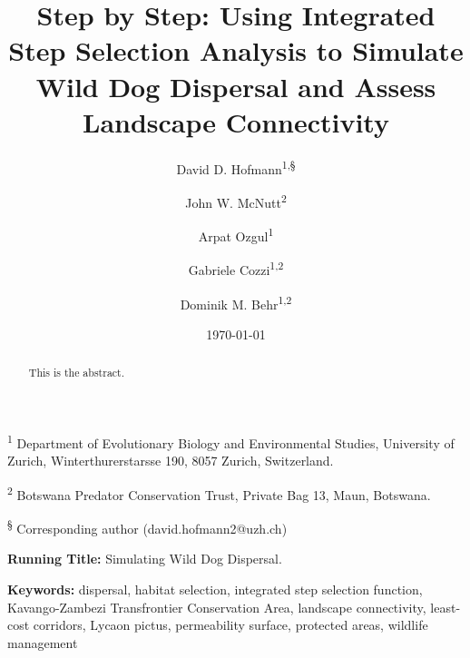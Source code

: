 \documentclass[abstract=on,10pt,a4paper,bibliography=totocnumbered]{article}
\title{Step by Step: Using Integrated Step Selection Analysis to Simulate Wild
Dog Dispersal and Assess Landscape Connectivity}
\author{
  David D. Hofmann\textsuperscript{1,\S} \and
  John W. McNutt\textsuperscript{2} \and
  Arpat Ozgul\textsuperscript{1} \and
  Gabriele Cozzi\textsuperscript{1,2} \and
  Dominik M. Behr\textsuperscript{1,2}
}
\date{\today}
\begin{document}



\maketitle

\begin{flushleft}

\vspace{0.5cm}

\textsuperscript{1} Department of Evolutionary Biology and Environmental
Studies, University of Zurich, Winterthurerstarsse 190, 8057 Zurich,
Switzerland.

\textsuperscript{2} Botswana Predator Conservation Trust, Private Bag 13, Maun,
Botswana.

\textsuperscript{\S} Corresponding author (david.hofmann2@uzh.ch)

\vspace{4cm}

\textbf{Running Title:} Simulating Wild Dog Dispersal.

\vspace{0.5cm}

\textbf{Keywords:} dispersal, habitat selection, integrated step selection
function, Kavango-Zambezi Transfrontier Conservation Area, landscape
connectivity, least-cost corridors, Lycaon pictus, permeability surface,
protected areas, wildlife management

\end{flushleft}

\newpage
\begin{abstract}
This is the abstract.
\end{abstract}

\newpage


\end{document}
